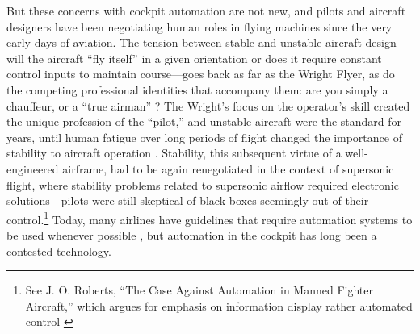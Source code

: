 
 But these concerns with cockpit automation are not
new, and pilots and aircraft designers have been negotiating human
roles in flying machines since the very early days of aviation. The
tension between stable and unstable aircraft design---will the
aircraft ``fly itself'' in a given orientation or does it require
constant control inputs to maintain course---goes back as far as the
Wright Flyer, as do the competing professional identities that
accompany them: are you simply a chauffeur, or a ``true
airman'' \cite[p. 21]{DM}? The Wright's focus on the operator's
skill created the unique profession of the
``pilot,'' and unstable aircraft were the standard for years, until
human fatigue over long periods of flight changed the importance of
stability to aircraft operation \cite[p. 22-24]{DM}. Stability,
this subsequent virtue of a well-engineered airframe, had to be again
renegotiated in the context of supersonic flight, where stability
problems related to supersonic airflow required electronic
solutions---pilots were still skeptical of black boxes seemingly out
of their control.\footnote{See J. O. Roberts, ``The Case Against
  Automation in Manned Fighter Aircraft,'' which argues for emphasis on
information display rather automated control \cite[p. 35]{DM}} Today, 
many airlines 
have guidelines that require automation systems to be used
whenever possible \cite[p. 38]{PARCCAST}, but automation in the
cockpit has long been a contested technology. 


